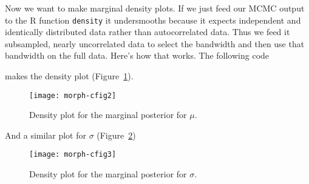 \documentclass{article}
\begin{document}
Now we want to make marginal density plots.
If we just feed our MCMC output to the R function \texttt{density}
it undersmooths because it expects independent and identically distributed
data rather than autocorrelated
data.  Thus we feed it subsampled, nearly uncorrelated data to select
the bandwidth and then use that bandwidth on the full data.  Here's
how that works.
The following code
\begin{Schunk}
\end{Schunk}
makes the density plot (Figure~\ref{fig:cfig2}).
\begin{figure}
\begin{center}
\texttt{[image: morph-cfig2]}
\end{center}
\caption{Density plot for the marginal posterior for $\mu$.}
\label{fig:cfig2}
\end{figure}
And a similar plot for $\sigma$ (Figure~\ref{fig:cfig3})
\begin{figure}
\begin{center}
\texttt{[image: morph-cfig3]}
\end{center}
\caption{Density plot for the marginal posterior for $\sigma$.}
\label{fig:cfig3}
\end{figure}
\end{document}
